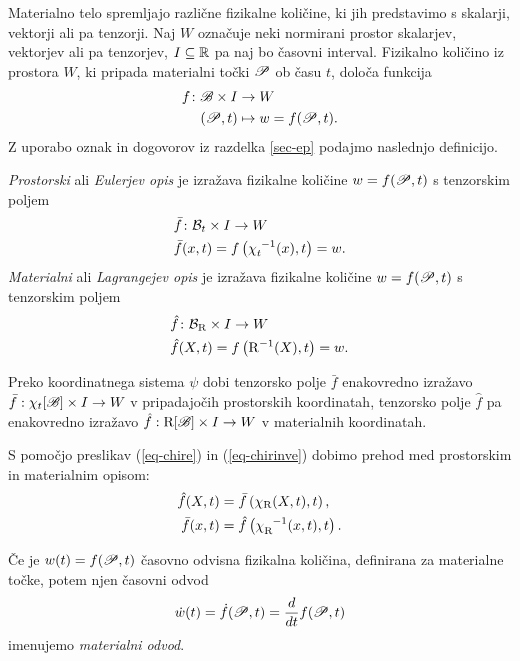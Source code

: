 Materialno telo spremljajo različne fizikalne količine, ki jih predstavimo s skalarji,
vektorji ali pa tenzorji. Naj $W$ označuje neki normirani prostor
skalarjev, vektorjev ali pa tenzorjev, $I\subseteq\R$ pa naj bo časovni interval.
Fizikalno količino iz prostora $W$, ki pripada materialni točki $\P$ ob času $t$, določa funkcija
\begin{align*}
	f \colon \B\times I &\rightarrow W \\
	(\P,t) &\mapsto w = f(\P,t).
\end{align*}
Z uporabo oznak in dogovorov iz razdelka \ref{sec-ep} podajmo naslednjo definicijo.
\begin{definicija}
	\emph{Prostorski} ali \emph{Eulerjev opis} je izražava fizikalne količine $w=f(\P,t)$ s
	tenzorskim poljem
	\begin{align*}
		&\bar{f}\colon\body_t\times I \rightarrow W \\
		&\bar{f}(x,t)=f\left(\chi_t^{\phantom{t}-1}(x),t\right)=w.
	\end{align*}
	\emph{Materialni} ali \emph{Lagrangejev opis} je izražava fizikalne količine $w=f(\P,t)$ s
	tenzorskim poljem
	\begin{align*}
		&\hat{f}\colon\body_{\r}\times I \rightarrow W \\
		&\hat{f}(X,t)=f\left(\r^{-1}(X),t\right)=w.
	\end{align*}
\end{definicija}
\begin{opomba}
	Preko koordinatnega sistema $\psi$ dobi tenzorsko polje $\bar{f}$ enakovredno izražavo
	$\bar{f}:\chi_t[\B]\times I\rightarrow W$ v pripadajočih prostorskih koordinatah,
	tenzorsko polje $\hat{f}$ pa enakovredno izražavo $\hat{f}:\r[\B]\times I\rightarrow W$
	v materialnih koordinatah.
\end{opomba}
S pomočjo preslikav (\ref{eq-chire}) in (\ref{eq-chirinve}) dobimo prehod med prostorskim in
materialnim opisom:
\begin{subequations}\begin{align}
	\hat{f}(X,t)&=\bar{f}\left(\chi_{\r}(X,t),t\right), \\
	\bar{f}(x,t)&=\hat{f}\left(\chi_{\r}^{\phantom{\r}-1}(x,t),t\right). \label{eq-transf-pro-mat}
\end{align}\end{subequations}
\begin{definicija}
	Če je $w(t) = f(\P,t)$ časovno odvisna fizikalna količina, definirana za materialne točke, potem njen
	časovni odvod
	\begin{equation*}
		\dot{w}(t)=\dot{f}(\P,t)=\frac{d}{dt}f(\P,t)
	\end{equation*}
	imenujemo \emph{materialni odvod}.
\end{definicija}
